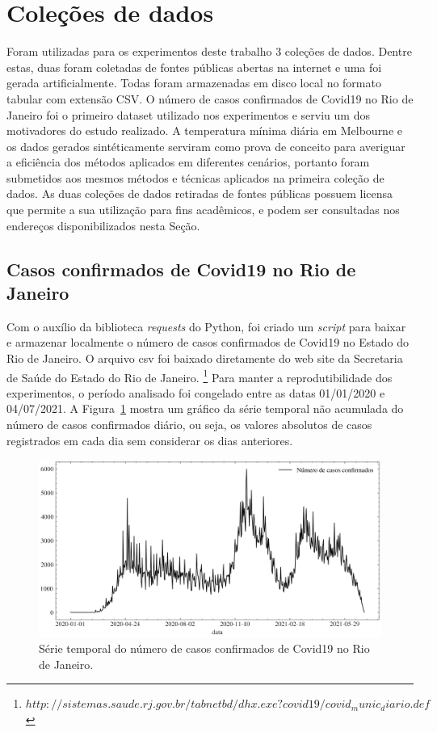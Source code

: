 \section{Coleções de dados}
Foram utilizadas para os experimentos deste trabalho 3 coleções de dados. Dentre estas, duas foram coletadas de fontes públicas abertas na internet e uma foi gerada artificialmente. Todas foram armazenadas em disco local no formato tabular com extensão CSV. O número de casos confirmados de Covid19 no Rio de Janeiro foi o primeiro dataset utilizado nos experimentos e serviu um dos motivadores do estudo realizado. A temperatura mínima diária em Melbourne e os dados gerados sintéticamente serviram como prova de conceito para averiguar a eficiência dos métodos aplicados em diferentes cenários, portanto foram submetidos aos mesmos métodos e técnicas aplicados na primeira coleção de dados. As duas coleções de dados retiradas de fontes públicas possuem licensa que permite a sua utilização para fins acadêmicos, e podem ser consultadas nos endereços disponibilizados nesta Seção.

\subsection{Casos confirmados de Covid19 no Rio de Janeiro} \label{subsec:casos_confirmados}
Com o auxílio da biblioteca \textit{requests} do Python, foi criado um \textit{script} para baixar e armazenar localmente o número de casos confirmados de Covid19 no Estado do Rio de Janeiro. O arquivo csv foi baixado diretamente do web site da Secretaria de Saúde do Estado do Rio de Janeiro. \footnote{$http://sistemas.saude.rj.gov.br/tabnetbd/dhx.exe?covid19/covid_munic_diario.def$} Para manter a reprodutibilidade dos experimentos, o período analisado foi congelado entre as datas 01/01/2020 e 04/07/2021. A Figura~\ref{fig:casos_confirmados} mostra um gráfico da série temporal não acumulada do número de casos confirmados diário, ou seja, os valores absolutos de casos registrados em cada dia sem considerar os dias anteriores.

\begin{figure}[!htp]
    \centering
    \includegraphics[width=5.0in]{img/casos_confirmados.pdf}
    \caption{Série temporal do número de casos confirmados de Covid19 no Rio de Janeiro.}
    \label{fig:casos_confirmados}
\end{figure}


